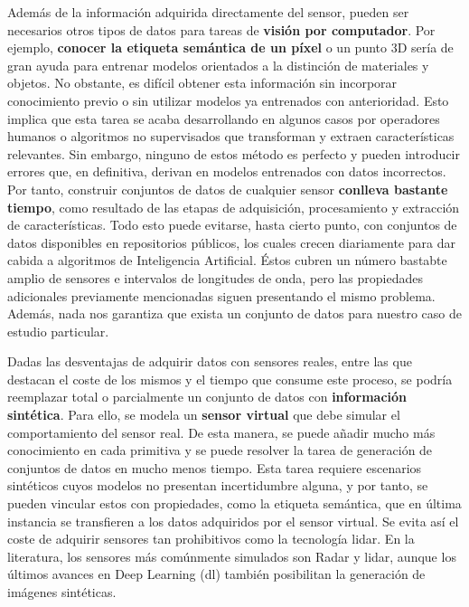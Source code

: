 Además de la información adquirida directamente del sensor, pueden ser necesarios otros tipos de datos para tareas de \textbf{visión por computador}. Por ejemplo, \textbf{conocer la etiqueta semántica de un píxel} o un punto 3D sería de gran ayuda para entrenar modelos orientados a la distinción de materiales y objetos. No obstante, es difícil obtener esta información sin incorporar conocimiento previo o sin utilizar modelos ya entrenados con anterioridad. Esto implica que esta tarea se acaba desarrollando en algunos casos por operadores humanos o algoritmos no supervisados que transforman y extraen características relevantes. Sin embargo, ninguno de estos método es perfecto y pueden introducir errores que, en definitiva, derivan en modelos entrenados con datos incorrectos. Por tanto, construir conjuntos de datos de cualquier sensor \textbf{conlleva bastante tiempo}, como resultado de las etapas de adquisición, procesamiento y extracción de características. Todo esto puede evitarse, hasta cierto punto, con conjuntos de datos disponibles en repositorios públicos, los cuales crecen diariamente para dar cabida a algoritmos de Inteligencia Artificial. Éstos cubren un número bastabte amplio de sensores e intervalos de longitudes de onda, pero las propiedades adicionales previamente mencionadas siguen presentando el mismo problema. Además, nada nos garantiza que exista un conjunto de datos para nuestro caso de estudio particular.

Dadas las desventajas de adquirir datos con sensores reales, entre las que destacan el coste de los mismos y el tiempo que consume este proceso, se podría reemplazar total o parcialmente un conjunto de datos con \textbf{información sintética}. Para ello, se modela un \textbf{sensor virtual} que debe simular el comportamiento del sensor real. De esta manera, se puede añadir mucho más conocimiento en cada primitiva y se puede resolver la tarea de generación de conjuntos de datos en mucho menos tiempo. Esta tarea requiere escenarios sintéticos cuyos modelos no presentan incertidumbre alguna, y por tanto, se pueden vincular estos con propiedades, como la etiqueta semántica, que en última instancia se transfieren a los datos adquiridos por el sensor virtual. Se evita así el coste de adquirir sensores tan prohibitivos como la tecnología \acrshort{lidar}. En la literatura, los sensores más comúnmente simulados son Radar y \acrshort{lidar}, aunque los últimos avances en Deep Learning (\acrshort{dl}) también posibilitan la generación de imágenes sintéticas.

